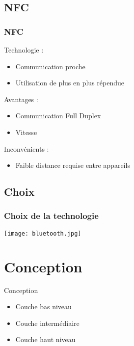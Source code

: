 \documentclass{beamer}
\begin{document}
      \subsection{NFC}
      \begin{frame}
	  \frametitle{NFC}
	  \begin{block}{Technologie :}
	  \begin{itemize}
	   \item Communication proche 
	   \item Utilisation de plus en plus répendue
	  \end{itemize}
	  \end{block}
	  \begin{block}{Avantages :}
	  \begin{itemize}
	   \item Communication Full Duplex
	   \item Vitesse
	  \end{itemize}
	  \end{block}
	  \begin{block}{Inconvénients :}
	  \begin{itemize}
	   \item Faible distance requise entre appareils
	  \end{itemize}
	  \end{block}
      \end{frame}
      \subsection{Choix}
      \begin{frame}
	  \frametitle{Choix de la technologie}
	  \begin{center}
	     \texttt{[image: bluetooth.jpg]}
      \end{center}
      \end{frame}
    \section{Conception}
    \begin{frame}{Conception}
        \begin{itemize}
            \item Couche bas niveau
            \item Couche intermédiaire
            \item Couche haut niveau
        \end{itemize}
    \end{frame}
\end{document}
